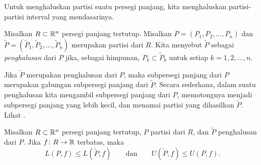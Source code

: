 Untuk menghaluskan partisi suatu persegi panjang, kita menghaluskan
partisi-partisi interval yang mendasarinya.

\begin{defn}
Misalkan $R \subset {\mathbb{R}}^n$ persegi panjang tertutup.
Misalkan $P = ( P_1, P_2, \ldots, P_n )$ dan
$\widetilde{P} = ( \widetilde{P}_1, \widetilde{P}_2, \ldots, \widetilde{P}_n )$
merupakan partisi dari $R$. Kita menyebut $\widetilde{P}$ sebagai
\emph{penghalusan} dari $P$ jika, sebagai himpunan,
$P_k \subset \widetilde{P}_k$ untuk setiap $k = 1,2,\ldots,n$.
\end{defn}

Jika $\widetilde{P}$ merupakan penghalusan dari $P$, maka subpersegi panjang
dari $P$ merupakan gabungan subpersegi panjang dari $\widetilde{P}$. Secara
sederhana, dalam suatu penghalusan kita mengambil subpersegi panjang dari $P$,
memotongnya menjadi subpersegi panjang yang lebih kecil, dan menamai partisi
yang dihasilkan $\widetilde{P}$. Lihat .

\begin{myfigureht}
\caption{Contoh penghalusan partisi dari .
 baru ditandai dengan garis putus-putus. Urutan persis
subpersegi panjang baru tidak penting.\label{mv:figrectpart}}
\end{myfigureht}

\begin{prop} \label{mv:prop:refinement}
Misalkan $R \subset {\mathbb{R}}^n$ persegi panjang tertutup, $P$ partisi dari $R$, dan
$\widetilde{P}$ penghalusan dari $P$. Jika $f \colon R \to {\mathbb{R}}$ terbatas, maka
\begin{equation*}
L(P,f) \leq L(\widetilde{P},f) 
\qquad \text{dan} \qquad
U(\widetilde{P},f) \leq U(P,f) .
\end{equation*}
\end{prop}

